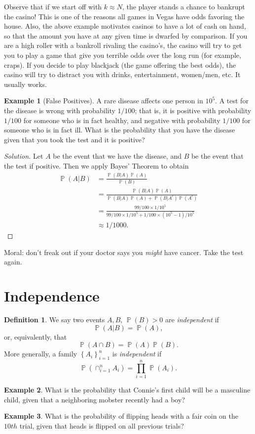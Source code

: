 \documentclass[12pt]{amsbook}
\DeclareMathOperator{\prob}{\mathbb{P}}
\theoremstyle{plain}
\theoremstyle{definition}
\newtheorem*{definition}{Definition}
\newtheorem*{example}{Example}
\theoremstyle{remark}
\numberwithin{equation}{section}  %
\numberwithin{equation}{section}  %
\begin{document}
Observe that if we start off with $k \approx N$, the player stands a chance to
bankrupt the casino! This is one of the reasons all games in Vegas have odds
favoring the house. Also, the above example motivates casinos to have a lot of
cash on hand, so that the amount you have at any given time is dwarfed by
comparison. If you are a high roller with a bankroll rivaling the casino's,
the casino will try to get you to play a game that give you terrible odds over
the long run (for example, craps). If you decide to play blackjack (the game
offering the best odds), the casino will try to distract you with drinks,
entertainment, women/men, etc. It usually works.
\begin{example}[False Positives]
	A rare disease affects one person in $10^5$. A test for the disease
	is wrong with probability $1/100$; that is, it is positive with probability
	$1/100$ for someone who is in fact healthy, and negative
	with probability $1/100$ for someone who is in fact ill. What is the 
	probability
	that you have the disease given that you took the test and it is positive?
\end{example}
\begin{proof}[Solution]
	Let $A$ be the event that we have the disease, and $B$ be the event
	that the test if positive. Then we apply
	Bayes' Theorem to obtain
	\begin{align*}
		\prob(A | B) & = \frac{\prob(B | A) \prob(A)}{\prob(B)}
		\\
		& = \frac{\prob(B | A) \prob(A)}{\prob(B|A) \prob(A) + \prob(B | A^c)
		\prob(A^c)}
		\\
		& = \frac{99/100 \times 1/10^5}{99/100 \times 1/10^5 + 1/100 \times 
			(10^5 -
		1)/10^5}
		\\
		& \approx 1/1000.
	\end{align*}
\end{proof}
Moral: don't freak out if your doctor says you \emph{might} have
cancer. Take the test again.
\section{Independence}
\begin{definition}
	We say two events $A, B$, $\prob(B) > 0$ are \emph{independent} if 
	\[\prob(A |
	B) = \prob(A),\] or, equivalently, that \[\prob(A \cap B) = \prob(A) 
	\prob(B).\] More generally,
	a family $ {\left\{ A_i \right\}}_{i = 1}^n $ is
	\emph{independent} if 
	\[ \prob(\cap_{i = 1}^n A_i) = \prod_{i = 1}^n \prob(A_i).\]
\end{definition}
\begin{example}
	What is the probability that Connie's first child will be a masculine child,
	given that a neighboring mobster recently had a boy?
\end{example}
\begin{example}
	What is the probability of flipping heads with a fair coin on the $10th$ 
	trial,
	given that heads is flipped on all previous trials?
\end{example}
\end{document}
